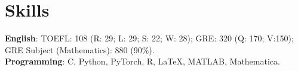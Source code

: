 \documentclass[letterpaper,11pt]{article}
\newcommand{\resumeItem}[1]{
  \item\small{
    {#1 \vspace{-2pt}}
  }
}
\newcommand{\resumeItemListStart}{\begin{itemize}}
\newcommand{\resumeItemListEnd}{\end{itemize}\vspace{-5pt}}
\begin{document}

%
\section{Skills}
 \begin{itemize}[leftmargin=0.15in, label={}]
    \small{\item{
     \textbf{English}{: TOEFL: 108 (R: 29; L: 29; S: 22; W: 28); GRE: 320 (Q: 170; V:150); GRE Subject (Mathematics): 880 (90\%). } \\
     \textbf{Programming}{: C, Python, PyTorch, R, LaTeX, MATLAB, Mathematica.} \\
      
    }}
 \end{itemize}





\end{document}
